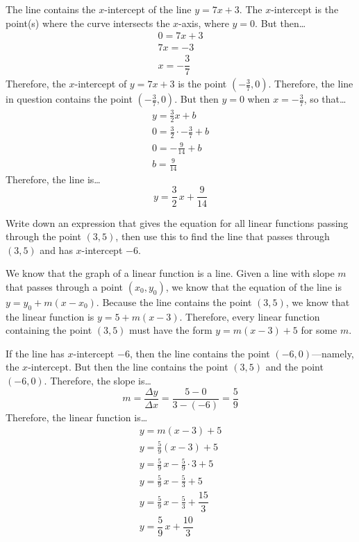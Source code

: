 \documentclass[11pt,letterpaper]{article}
\begin{document}
The line contains the $x$-intercept of the line $y= 7x + 3$. The $x$-intercept is the point(s) where the curve intersects the $x$-axis, where $y= 0$. But then\dots
	\[
	\begin{gathered}
	0= 7x + 3 \\
	7x= -3 \\
	x= -\dfrac{3}{7}
	\end{gathered}
	\]
Therefore, the $x$-intercept of $y= 7x + 3$ is the point $(-\frac{3}{7}, 0)$. Therefore, the line in question contains the point $(-\frac{3}{7}, 0)$. But then $y= 0$ when $x= -\frac{3}{7}$, so that\dots
	\[
	\begin{gathered}
	y= \frac{3}{2}x + b \\
	0= \frac{3}{2} \cdot -\frac{3}{7} + b \\
	0= -\frac{9}{14} + b \\
	b= \frac{9}{14}
	\end{gathered}
	\]
Therefore, the line is\dots
	\[
	y= \frac{3}{2}\,x + \frac{9}{14}
	\]



\newpage



 Write down an expression that gives the equation for all linear functions passing through the point $(3, 5)$, then use this to find the line that passes through $(3, 5)$ and has $x$-intercept $-6$. \pspace

\sol We know that the graph of a linear function is a line. Given a line with slope $m$ that passes through a point $(x_0, y_0)$, we know that the equation of the line is $y= y_0 + m(x - x_0)$. Because the line contains the point $(3, 5)$, we know that the linear function is $y= 5 + m(x - 3)$. Therefore, every linear function containing the point $(3, 5)$ must have the form $y= m(x - 3) + 5$ for some $m$. \pspace

If the line has $x$-intercept $-6$, then the line contains the point $(-6, 0)$---namely, the $x$-intercept. But then the line contains the point $(3, 5)$ and the point $(-6, 0)$. Therefore, the slope is\dots
	\[
	m= \dfrac{\Delta y}{\Delta x}= \dfrac{5 - 0}{3 - (-6)}= \dfrac{5}{9}
	\]
Therefore, the linear function is\dots
	\[
	\begin{gathered}
	y= m(x - 3) + 5 \\[0.3cm]
	y=  \frac{5}{9} (x - 3) + 5 \\[0.3cm]
	y= \frac{5}{9}\, x - \frac{5}{9} \cdot 3 + 5 \\[0.3cm]
	y= \frac{5}{9}\, x - \frac{5}{3} + 5 \\[0.3cm]
	y= \frac{5}{9}\, x - \frac{5}{3} + \dfrac{15}{3} \\[0.3cm]
	y= \dfrac{5}{9}\,x + \dfrac{10}{3}
	\end{gathered}
	\]
\end{document}
